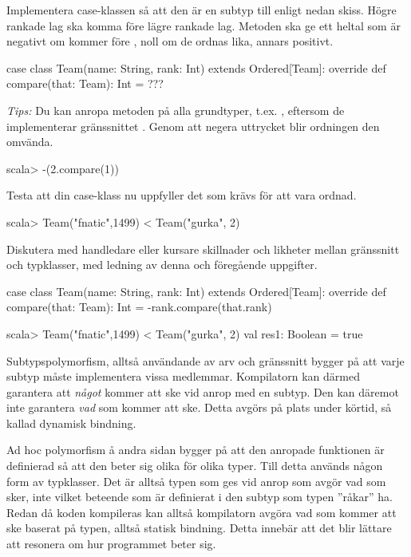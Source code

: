 \Subtask Implementera case-klassen  så att den är en subtyp till  enligt nedan skiss. Högre rankade lag ska komma före lägre rankade lag. Metoden  ska ge ett heltal som är negativt om  kommer före , noll om de ordnas lika, annars positivt.

\begin{Code}
case class Team(name: String, rank: Int) extends Ordered[Team]:
  override def compare(that: Team): Int = ???
\end{Code}
\emph{Tips:} Du kan anropa metoden  på alla grundtyper, t.ex. , eftersom de implementerar gränssnittet . Genom att negera uttrycket blir ordningen den omvända. 

\begin{REPLnonum}
scala> -(2.compare(1))
\end{REPLnonum}

\Subtask Testa att  din case-klass nu uppfyller det som krävs för att vara ordnad.
\begin{REPLnonum}
scala> Team("fnatic",1499) < Team("gurka", 2)
\end{REPLnonum}


\Subtask Diskutera med handledare eller kursare skillnader och likheter mellan gränssnitt och typklasser, med ledning av denna och föregående uppgifter.
\SOLUTION


\TaskSolved \what

\SubtaskSolved

\begin{Code}
case class Team(name: String, rank: Int) extends Ordered[Team]:
  override def compare(that: Team): Int = -rank.compare(that.rank)
\end{Code}

\SubtaskSolved

\begin{REPLnonum}
scala> Team("fnatic",1499) < Team("gurka", 2)
val res1: Boolean = true
\end{REPLnonum}

\SubtaskSolved
Subtypspolymorfism, alltså användande av arv och gränssnitt  bygger på att varje subtyp måste implementera vissa medlemmar. 
Kompilatorn kan därmed garantera att \emph{något} kommer att ske vid anrop med en subtyp.
Den kan däremot inte garantera \emph{vad} som kommer att ske. Detta avgörs på plats under körtid,
så kallad dynamisk bindning.

Ad hoc polymorfism å andra sidan bygger på att den anropade funktionen är definierad 
så att den beter sig olika för olika typer. Till detta används någon form av typklasser.
Det är alltså typen som ges vid anrop som avgör vad som sker, 
inte vilket beteende som är definierat i den subtyp som typen ''råkar'' ha.
Redan då koden kompileras kan alltså kompilatorn avgöra vad som kommer att ske baserat på
typen, alltså statisk bindning. Detta innebär att det blir lättare att resonera om
hur programmet beter sig.

